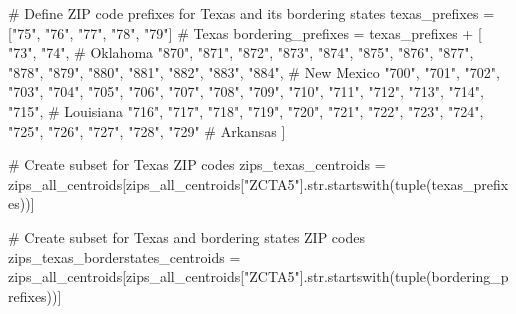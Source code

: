 \documentclass[
  letterpaper,
  DIV=11,
  numbers=noendperiod]{scrartcl}
\newenvironment{Shaded}{\begin{snugshade}}{\end{snugshade}}
\newcommand{\BuiltInTok}[1]{\textcolor[rgb]{0.00,0.23,0.31}{#1}}
\newcommand{\CommentTok}[1]{\textcolor[rgb]{0.37,0.37,0.37}{#1}}
\newcommand{\NormalTok}[1]{\textcolor[rgb]{0.00,0.23,0.31}{#1}}
\newcommand{\OperatorTok}[1]{\textcolor[rgb]{0.37,0.37,0.37}{#1}}
\newcommand{\StringTok}[1]{\textcolor[rgb]{0.13,0.47,0.30}{#1}}
\begin{document}
\begin{Shaded}
\begin{Highlighting}[]
\CommentTok{\# Define ZIP code prefixes for Texas and its bordering states}
\NormalTok{texas\_prefixes }\OperatorTok{=}\NormalTok{ [}\StringTok{"75"}\NormalTok{, }\StringTok{"76"}\NormalTok{, }\StringTok{"77"}\NormalTok{, }\StringTok{"78"}\NormalTok{, }\StringTok{"79"}\NormalTok{]  }\CommentTok{\# Texas}
\NormalTok{bordering\_prefixes }\OperatorTok{=}\NormalTok{ texas\_prefixes }\OperatorTok{+}\NormalTok{ [}
    \StringTok{"73"}\NormalTok{, }\StringTok{"74"}\NormalTok{,              }\CommentTok{\# Oklahoma}
    \StringTok{"870"}\NormalTok{, }\StringTok{"871"}\NormalTok{, }\StringTok{"872"}\NormalTok{, }\StringTok{"873"}\NormalTok{, }\StringTok{"874"}\NormalTok{, }\StringTok{"875"}\NormalTok{, }\StringTok{"876"}\NormalTok{, }\StringTok{"877"}\NormalTok{, }\StringTok{"878"}\NormalTok{, }\StringTok{"879"}\NormalTok{, }\StringTok{"880"}\NormalTok{, }\StringTok{"881"}\NormalTok{, }\StringTok{"882"}\NormalTok{, }\StringTok{"883"}\NormalTok{, }\StringTok{"884"}\NormalTok{,  }\CommentTok{\# New Mexico}
    \StringTok{"700"}\NormalTok{, }\StringTok{"701"}\NormalTok{, }\StringTok{"702"}\NormalTok{, }\StringTok{"703"}\NormalTok{, }\StringTok{"704"}\NormalTok{, }\StringTok{"705"}\NormalTok{, }\StringTok{"706"}\NormalTok{, }\StringTok{"707"}\NormalTok{, }\StringTok{"708"}\NormalTok{, }\StringTok{"709"}\NormalTok{, }\StringTok{"710"}\NormalTok{, }\StringTok{"711"}\NormalTok{, }\StringTok{"712"}\NormalTok{, }\StringTok{"713"}\NormalTok{, }\StringTok{"714"}\NormalTok{, }\StringTok{"715"}\NormalTok{,  }\CommentTok{\# Louisiana}
    \StringTok{"716"}\NormalTok{, }\StringTok{"717"}\NormalTok{, }\StringTok{"718"}\NormalTok{, }\StringTok{"719"}\NormalTok{, }\StringTok{"720"}\NormalTok{, }\StringTok{"721"}\NormalTok{, }\StringTok{"722"}\NormalTok{, }\StringTok{"723"}\NormalTok{, }\StringTok{"724"}\NormalTok{, }\StringTok{"725"}\NormalTok{, }\StringTok{"726"}\NormalTok{, }\StringTok{"727"}\NormalTok{, }\StringTok{"728"}\NormalTok{, }\StringTok{"729"}  \CommentTok{\# Arkansas}
\NormalTok{]}

\CommentTok{\# Create subset for Texas ZIP codes}
\NormalTok{zips\_texas\_centroids }\OperatorTok{=}\NormalTok{ zips\_all\_centroids[zips\_all\_centroids[}\StringTok{"ZCTA5"}\NormalTok{].}\BuiltInTok{str}\NormalTok{.startswith(}\BuiltInTok{tuple}\NormalTok{(texas\_prefixes))]}

\CommentTok{\# Create subset for Texas and bordering states ZIP codes}
\NormalTok{zips\_texas\_borderstates\_centroids }\OperatorTok{=}\NormalTok{ zips\_all\_centroids[zips\_all\_centroids[}\StringTok{"ZCTA5"}\NormalTok{].}\BuiltInTok{str}\NormalTok{.startswith(}\BuiltInTok{tuple}\NormalTok{(bordering\_prefixes))]}


\end{Highlighting}
\end{Shaded}
\end{document}
